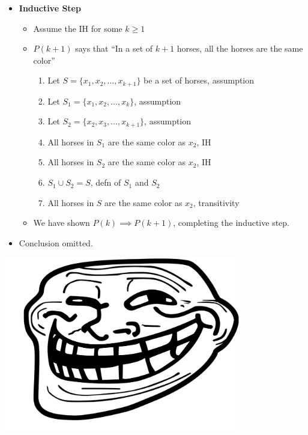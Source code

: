 \begin{frame}

  \begin{itemize}

  \item \textbf{Inductive Step}
    \begin{itemize}
    \item Assume the IH for some $k \geq 1$
    \item $P(k+1)$ says that ``In a set of $k+1$ horses, all the horses are the same color''
      \begin{enumerate}
      \item Let $S = \{x_1, x_2, \dotsc, x_{k+1}\}$ be a set of horses, assumption
      \item Let $S_1 = \{x_1, x_2, \dotsc, x_k\}$, assumption
      \item Let $S_2 = \{x_2, x_3, \dotsc, x_{k+1}\}$, assumption
      \item All horses in $S_1$ are the same color as $x_2$, IH
      \item All horses in $S_2$ are the same color as $x_2$, IH
      \item $S_1 \cup S_2 = S$, defn of $S_1$ and $S_2$
      \item All horses in $S$ are the same color as $x_2$, transitivity
      \end{enumerate}
    \item We have shown $P(k) \implies P(k+1)$, completing the inductive step.
    \end{itemize}
    \pause

  \item Conclusion omitted.
  \end{itemize}
\end{frame}

\begin{frame}
  \includegraphics[height=3in]{troll.jpg}
\end{frame}

